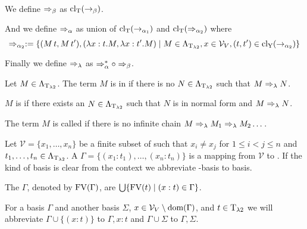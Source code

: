 \begin{definition}~

We define $\Rightarrow_\beta$ as $\text{cl\textsubscript{T}}(\rightarrow_\beta)$.

And we define $\Rightarrow_\alpha$ as union of $\text{cl\textsubscript{T}}(\rightarrow_{\alpha_1})$ and $\text{cl\textsubscript{T}}(\Rightarrow_{\alpha_2})$ where \[\Rightarrow_{\alpha_2}:=\{(M\,t,M\,t'),(\lambda x:t.M,\lambda x:t'.M)\mid M\in\Lambda_{\text{T}_{\lambda2}},x\in\mathcal{V}_V,(t,t')\in\text{cl\textsubscript{Y}}(\rightarrow_{\alpha_2})\}\]

Finally we define $\Rightarrow_\lambda$ as $\Rightarrow_\alpha^*\circ\Rightarrow_\beta$.
\end{definition}

\begin{definition}\label{def.2.8}
Let $M\in\Lambda_{\text{T}_{\lambda2}}$. The term $M$ is in  if there is no $N\in\Lambda_{\text{T}_{\lambda2}}$ such that $M\Rightarrow_\lambda N$.

$M$ is  if there exists an $N\in\Lambda_{\text{T}_{\lambda2}}$ such that $N$ is in normal form and $M\Rightarrow_\lambda N$.

The term $M$ is called  if there is no infinite chain $M\Rightarrow_\lambda M_1\Rightarrow_\lambda M_2\dots$.
\end{definition}

\begin{definition}\label{def.2.9} Let $\mathcal{V}=\{x_1,\dots,x_n\}$ be a finite subset of \lambdaValVar{} such that $x_i\neq x_j$ for $1\leq i<j\leq n$ and $t_1,\dots,t_n\in\Lambda_{\text{T}_{\lambda2}}$.	A  $\Gamma=\{(x_1:t_1),\dots,(x_n:t_n)\}$ is a mapping from $\mathcal{V}$ to \lambdaTypes{}. If the kind of basis is clear from the context we abbreviate \lambdaTwo-basis to basis. 

The  $\Gamma$, denoted by $\text{FV}(\Gamma)$, are $\bigcup\{\text{FV}(t)\mid(x:t)\in\Gamma\}$.
\end{definition}

For a basis $\Gamma$ and another basis $\Sigma$, $x\in\mathcal{V}_V\setminus\text{dom}(\Gamma)$, and $t\in\text{T}_{\lambda2}$ we will abbreviate $\Gamma\cup\{(x:t)\}$ to $\Gamma,x:t$ and $\Gamma\cup\Sigma$ to $\Gamma,\Sigma$. %

